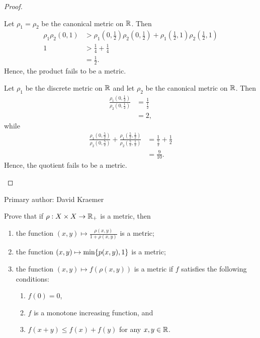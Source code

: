 \begin{proof}
\begin{enumerate}
            Let $\rho_1 = \rho_2$ be the canonical metric on $\mathbb{R}$. Then 
            \begin{align*}
                \rho_1\rho_2(0, 1) &> \rho_1(0,\tfrac{1}{2})
                \rho_2(0, \tfrac{1}{2}) + \rho_1(\tfrac{1}{2}, 1)
                \rho_2(\tfrac{1}{2}, 1) \\
                1 &> \tfrac{1}{4} + \tfrac{1}{4} \\
                &= \tfrac{1}{2}.
            \end{align*}
            Hence, the product fails to be a metric.

            Let $\rho_1$ be the discrete metric on $\mathbb{R}$ and let $\rho_2$ be the
            canonical metric on $\mathbb{R}$. Then
            \begin{align*}
                \frac{\rho_1(0,\tfrac{1}{2})}{\rho_2(0,\tfrac{1}{2})} &=
                \frac{1}{\tfrac{1}{2}} \\
                &= 2,
            \end{align*}
            while
            \begin{align*}
                \frac{\rho_1(0,\tfrac{5}{2})}{\rho_2(0,\tfrac{5}{2})} + 
                \frac{\rho_1(\tfrac{5}{2},\tfrac{1}{2})}{\rho_2(\tfrac{5}{2},\tfrac{1}{2})}
                &= \frac{1}{\tfrac{5}{2}} + \frac{1}{2} \\
                &= \frac{9}{10}.
            \end{align*}
            Hence, the quotient fails to be a metric.
    \end{enumerate}
\end{proof}

Primary author: David Kraemer

\begin{minorEx}
    Prove that if $\rho : X \times X \to \mathbb{R}_+$ is a metric, then
    \begin{enumerate}
        \item the function $(x, y) \mapsto \frac{\rho(x,y)}{1 + \rho(x,y)}$ is a
            metric;
        \item the function $(x, y) \mapsto \min\{p(x,y), 1\}$ is a metric;
        \item the function $(x, y) \mapsto f(\rho(x,y))$ is a metric if $f$
            satisfies the following conditions:
            \begin{enumerate}
                \item $f(0) = 0$,
                \item $f$ is a monotone increasing function, and
                \item $f(x + y) \leq f(x) + f(y)$ for any $x, y \in \mathbb{R}$.
            \end{enumerate}
    \end{enumerate}
\end{minorEx}

